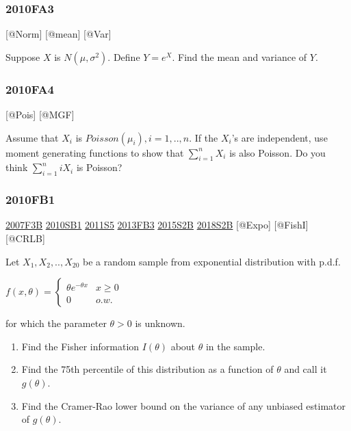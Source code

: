 \documentclass[6pt,twocolumn,Portrait]{article}
\begin{document}
\hypertarget{fa3-1}{%
\subsubsection{2010FA3}\label{fa3-1}}

{[}@Norm{]} {[}@mean{]} {[}@Var{]}

Suppose \(X\) is \(N(\mu,\sigma^2)\). Define \(Y=e^X\). Find the mean
and variance of \(Y\).

\hypertarget{fa4-1}{%
\subsubsection{2010FA4}\label{fa4-1}}

{[}@Pois{]} {[}@MGF{]}

Assume that \(X_i\) is \(Poisson(\mu_i),i=1,..,n\). If the \(X_i\)'s are
independent, use moment generating functions to show that
\(\sum_{i=1}^n X_i\) is also Poisson. Do you think \(\sum_{i=1}^n iX_i\)
is Poisson?

\hypertarget{fb1-1}{%
\subsubsection{2010FB1}\label{fb1-1}}

\protect\hyperlink{f3b}{2007F3B} \protect\hyperlink{sb1-1}{2010SB1}
\protect\hyperlink{s5-2}{2011S5} \protect\hyperlink{fb3-2}{2013FB3}
\protect\hyperlink{s2b-1}{2015S2B} \protect\hyperlink{s2b-2}{2018S2B}
{[}@Expo{]} {[}@FishI{]} {[}@CRLB{]}

Let \(X_1,X_2,..,X_{20}\) be a random sample from exponential
distribution with p.d.f.

\(f(x,\theta)=\begin{cases}\theta e^{-\theta x}& x\ge0\\0& o.w.\end{cases}\)

for which the parameter \(\theta>0\) is unknown.

\begin{enumerate}
\def\labelenumi{(\alph{enumi})}
\item
  Find the Fisher information \(I(\theta)\) about \(\theta\) in the
  sample.
\item
  Find the 75th percentile of this distribution as a function of
  \(\theta\) and call it \(g(\theta)\).
\item
  Find the Cramer-Rao lower bound on the variance of any unbiased
  estimator of \(g(\theta)\).
\end{enumerate}
\end{document}
